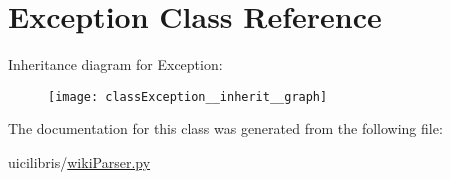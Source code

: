 \hypertarget{classException}{\section{\-Exception \-Class \-Reference}
\label{classException}
}


\-Inheritance diagram for \-Exception\-:
\nopagebreak
\begin{figure}[H]
\begin{center}
\leavevmode
\texttt{[image: classException\_\_inherit\_\_graph]}
\end{center}
\end{figure}


\-The documentation for this class was generated from the following file\-:\begin{DoxyCompactItemize}
\item 
uicilibris/\hyperlink{wikiParser_8py}{wiki\-Parser.\-py}\end{DoxyCompactItemize}
